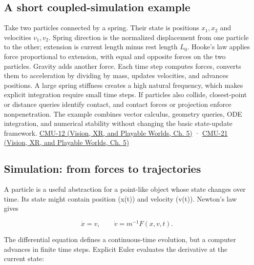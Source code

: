 \subsection{A short coupled-simulation example}\label{04-visual-computing-ii-ch029-a-short-coupled-simulation-example}

\hypertarget{04-visual-computing-ii-ch029-a-short-coupled-simulation-example}{}

Take two particles connected by a spring. Their state is positions \(x_1,x_2\) and velocities \(v_1,v_2\). Spring direction is the normalized displacement from one particle to the other; extension is current length minus rest length \(L_0\). Hooke's law applies force proportional to extension, with equal and opposite forces on the two particles. Gravity adds another force. Each time step computes forces, converts them to acceleration by dividing by mass, updates velocities, and advances positions. A large spring stiffness creates a high natural frequency, which makes explicit integration require small time steps. If particles also collide, closest-point or distance queries identify contact, and contact forces or projection enforce nonpenetration. The example combines vector calculus, geometry queries, ODE integration, and numerical stability without changing the basic state-update framework. \href{../07-Vision-XR-and-Playable-Worlds/main.pdf\#nameddest=04-visual-computing-ii-ch036-cmu-12---geometric-queries}{CMU-12 (Vision, XR, and Playable Worlds, Ch. 5)} · \href{../07-Vision-XR-and-Playable-Worlds/main.pdf\#nameddest=04-visual-computing-ii-ch036-cmu-21---dynamics-and-time-integration}{CMU-21 (Vision, XR, and Playable Worlds, Ch. 5)}

\subsection{Simulation: from forces to trajectories}\label{04-visual-computing-ii-ch029-simulation-from-forces-to-trajectories}

\hypertarget{04-visual-computing-ii-ch029-simulation-from-forces-to-trajectories}{}

A particle is a useful abstraction for a point-like object whose state changes over time. Its state might contain position (x(t)) and velocity (v(t)). Newton's law gives

\[
\dot{x}=v,\qquad \dot{v}=m^{-1}F(x,v,t).
\]

The differential equation defines a continuous-time evolution, but a computer advances in finite time steps. Explicit Euler evaluates the derivative at the current state:

